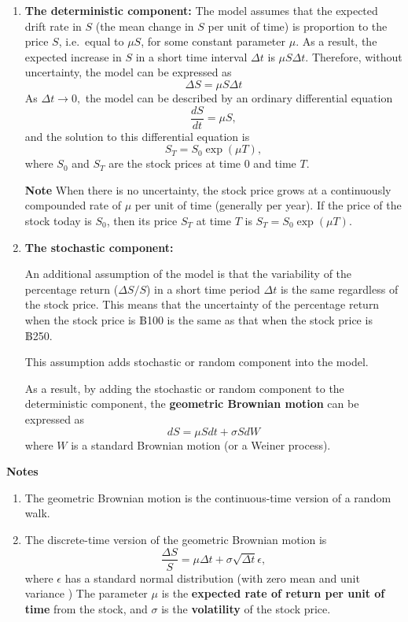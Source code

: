 \documentclass[landscape, 20pt]{extreport}
\theoremstyle{definition}
\theoremstyle{definition}
\theoremstyle{definition}
\theoremstyle{definition}
\theoremstyle{remark}
\begin{document}
\begin{enumerate}
\def\labelenumi{\arabic{enumi}.}
\item
  \textbf{The deterministic component:} The model assumes that the expected
  drift rate in \(S\) (the mean change in \(S\) per unit of time) is
  proportion to the price \(S\), i.e.~equal to \(\mu S\), for some
  constant parameter \(\mu\). As a result, the expected increase in \(S\)
  in a short time interval \(\Delta t\) is \(\mu S \Delta t\). Therefore,
  without uncertainty, the model can be expressed as
  \[\Delta S = \mu S \Delta t\] As \(\Delta t \rightarrow 0,\) the model
  can be described by an ordinary differential equation
  \[\frac{dS}{dt} = \mu S,\] and the solution to this differential
  equation is \[S_{T} = S_0 \exp(\mu T),\] where \(S_0\) and \(S_T\) are
  the stock prices at time 0 and time \(T\).

  \textbf{Note} When there is no uncertainty, the stock price grows at a
  continuously compounded rate of \(\mu\) per unit of time (generally
  per year). If the price of the stock today is \(S_0\), then its price
  \(S_T\) at time \(T\) is \(S_{T} = S_0 \exp(\mu T)\).
\item
  \textbf{The stochastic component:}

  An additional assumption of the model is that the variability of the
  percentage return (\(\Delta S/S\)) in a short time period \(\Delta t\)
  is the same regardless of the stock price. This means that the
  uncertainty of the percentage return when the stock price is ฿100 is
  the same as that when the stock price is ฿250.

  This assumption adds stochastic or random component into the model.

  As a result, by adding the stochastic or random component to the
  deterministic component, the \textbf{geometric Brownian motion} can be
  expressed as \[dS = \mu S dt + \sigma S dW\] where \(W\) is a standard
  Brownian motion (or a Weiner process).
\end{enumerate}

\textbf{Notes}

\begin{enumerate}
\def\labelenumi{\arabic{enumi}.}
\item
  The geometric Brownian motion is the continuous-time version of a
  random walk.
\item
  The discrete-time version of the geometric Brownian motion is
  \[\frac{\Delta S}{S} = \mu \Delta t + \sigma \sqrt{\Delta t} \epsilon,\]
  where \(\epsilon\) has a standard normal distribution (with zero mean
  and unit variance ) The parameter \(\mu\) is the \textbf{expected rate of
  return per unit of time} from the stock, and \(\sigma\) is the
  \textbf{volatility} of the stock price.
\end{enumerate}
\end{document}
